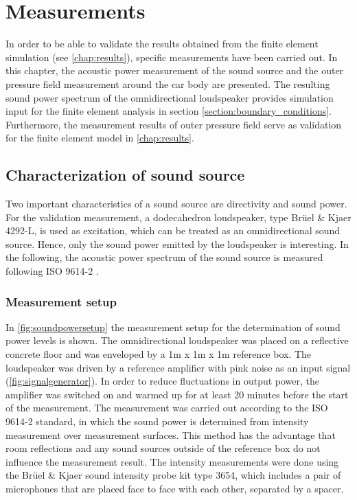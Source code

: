 \chapter{Measurements}
\label{chap:measurement}

In order to be able to validate the results obtained from the finite element simulation (see \cref{chap:results}), specific measurements have been carried out.
In this chapter, the acoustic power measurement of the sound source and the outer pressure field measurement around the car body are presented.
The resulting sound power spectrum of the omnidirectional loudspeaker provides simulation input for the finite element analysis in section \ref{section:boundary_conditions}.
Furthermore, the measurement results of outer pressure field serve as validation for the finite element model in \cref{chap:results}.

\section{Characterization of sound source}
\label{section:SWL_measurement}

Two important characteristics of a sound source are directivity and sound power. For the validation measurement, a dodecahedron loudspeaker, type Brüel \& Kjaer 4292-L, is used as excitation, which can be treated as an omnidirectional sound source.
Hence, only the sound power emitted by the loudspeaker is interesting.
In the following, the acoustic power spectrum of the sound source is measured following ISO 9614-2 \cite{din19969614}.

\subsection*{Measurement setup}

In \cref{fig:soundpowersetup} the measurement setup for the determination of sound power levels is shown.
The omnidirectional loudspeaker was placed on a reflective concrete floor and was enveloped by a 1m x 1m x 1m reference box.
The loudspeaker was driven by a reference amplifier with pink noise as an input signal (\cref{fig:signalgenerator}).
In order to reduce fluctuations in output power, the amplifier was switched on and warmed up for at least 20 minutes before the start of the measurement.
The measurement was carried out according to the ISO 9614-2 standard, in which the sound power is determined from intensity measurement over measurement surfaces.
This method has the advantage that room reflections and any sound sources outside of the reference box do not influence the measurement result.
The intensity measurements were done using the Brüel \& Kjaer sound intensity probe kit type 3654, which includes a pair of microphones that are placed face to face with each other, separated by a spacer.

